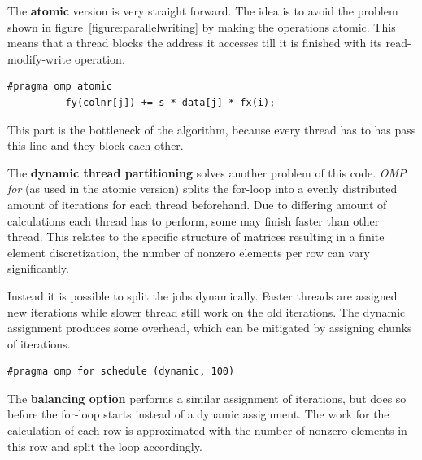 \documentclass[a4paper,11pt]{scrartcl}
\begin{document}
The \textbf{atomic} version is very straight forward. The idea is to avoid the
problem shown in figure~\ref{figure:parallelwriting} by making the operations
atomic. This means that a thread blocks the address it accesses till it is
finished with its read-modify-write operation.

\begin{lstlisting}
#pragma omp atomic
          fy(colnr[j]) += s * data[j] * fx(i);
\end{lstlisting}

This part is the bottleneck of the algorithm, because every thread has to has
pass this line and they block each other.

The \textbf{dynamic thread partitioning} solves another problem of this code.
{\em OMP for}\/ (as used in the atomic version) splits the for-loop into a
evenly distributed amount of iterations for each thread beforehand. Due to
differing amount of calculations each thread has to perform, some may finish
faster than other thread. This relates to the specific structure of matrices
resulting in a finite element discretization, the number of nonzero elements
per row can vary significantly.

Instead it is possible to split the jobs dynamically. Faster threads are
assigned new iterations while slower thread still work on the old iterations.
The dynamic assignment produces some overhead, which can be mitigated by
assigning chunks of iterations.

\begin{lstlisting}
#pragma omp for schedule (dynamic, 100)
\end{lstlisting}

The \textbf{balancing option} performs a similar assignment of iterations, but
does so before the for-loop starts instead of a dynamic assignment. The work
for the calculation of each row is approximated with the number of nonzero
elements in this row and split the loop accordingly.
\end{document}
